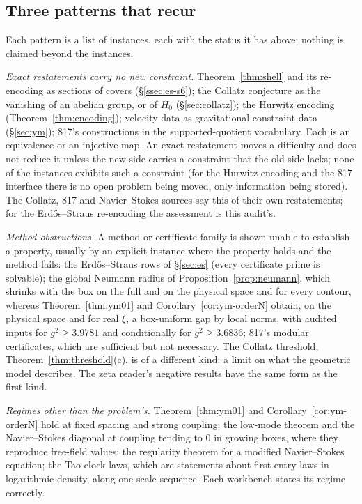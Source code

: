 \subsection{Three patterns that recur}

Each pattern is a list of instances, each with the status it has above; nothing is claimed beyond the instances.

\emph{Exact restatements carry no new constraint.} Theorem~\ref{thm:shell} and its re-encoding as sections of covers (§\ref{ssec:es-s6}); the Collatz conjecture as the vanishing of an abelian group, or of $H_0$ (§\ref{sec:collatz}); the Hurwitz encoding (Theorem~\ref{thm:encoding}); velocity data as gravitational constraint data (§\ref{sec:ym}); 817's constructions in the supported-quotient vocabulary. Each is an equivalence or an injective map. An exact restatement moves a difficulty and does not reduce it unless the new side carries a constraint that the old side lacks; none of the instances exhibits such a constraint (for the Hurwitz encoding and the 817 interface there is no open problem being moved, only information being stored). The Collatz, 817 and Navier--Stokes sources say this of their own restatements; for the Erdős--Straus re-encoding the assessment is this audit's.

\emph{Method obstructions.} A method or certificate family is shown unable to establish a property, usually by an explicit instance where the property holds and the method fails: the Erdős--Straus rows of §\ref{sec:es} (every certificate prime is solvable); the global Neumann radius of Proposition~\ref{prop:neumann}, which shrinks with the box on the full and on the physical space and for every contour, whereas Theorem~\ref{thm:ym01} and Corollary~\ref{cor:ym-orderN} obtain, on the physical space and for real $\xi$, a box-uniform gap by local norms, with audited inputs for $g^2\ge3.9781$ and conditionally for $g^2\ge3.6836$; 817's modular certificates, which are sufficient but not necessary. The Collatz threshold, Theorem~\ref{thm:threshold}(c), is of a different kind: a limit on what the geometric model describes. The zeta reader's negative results have the same form as the first kind.

\emph{Regimes other than the problem's.} Theorem~\ref{thm:ym01} and Corollary~\ref{cor:ym-orderN} hold at fixed spacing and strong coupling; the low-mode theorem and the Navier--Stokes diagonal at coupling tending to $0$ in growing boxes, where they reproduce free-field values; the regularity theorem for a modified Navier--Stokes equation; the Tao-clock laws, which are statements about first-entry laws in logarithmic density, along one scale sequence. Each workbench states its regime correctly.

